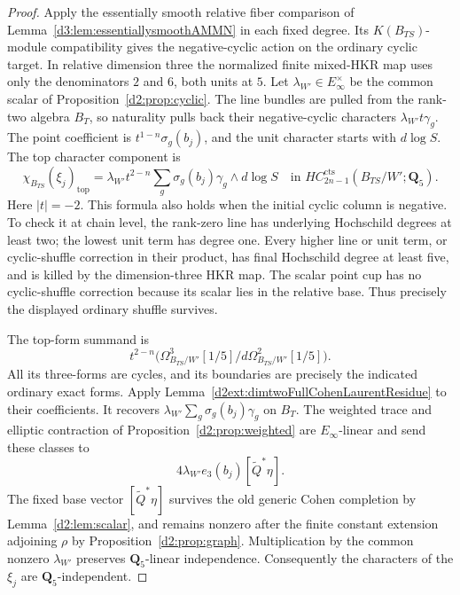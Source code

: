 \documentclass[11pt,a4paper]{amsart}
\numberwithin{equation}{section}
\theoremstyle{definition}
\theoremstyle{remark}
\begin{document}
\begin{proof}
Apply the essentially smooth relative fiber comparison of
Lemma~\ref{d3:lem:essentiallysmoothAMMN} in each fixed degree.
Its $K(B_{TS})$-module compatibility gives the negative-cyclic
action on the ordinary cyclic target.  In relative dimension
three the normalized finite mixed-HKR map uses only the
denominators $2$ and $6$, both units at $5$.
Let $\lambda_{W'}\in E_\infty^\times$ be the common scalar of
Proposition~\ref{d2:prop:cyclic}.
The line bundles are pulled from the rank-two algebra $B_T$,
so naturality pulls back their negative-cyclic characters
$\lambda_{W'}t\gamma_g$.
The point coefficient is $t^{1-n}\sigma_g(b_j)$, and the
unit character starts with $d\log S$.
The top character component is
\[
 \chi_{B_{TS}}(\xi_j)_{\mathrm{top}}
    =\lambda_{W'}t^{2-n}
       \sum_g\sigma_g(b_j)\gamma_g\wedge d\log S
       \quad\text{in }HC^{\mathrm{cts}}_{2n-1}(B_{TS}/W';
                                                    \mathbf Q_5).
\]
Here $|t|=-2$.  This formula also holds when the initial cyclic
column is negative.  To check it at chain level, the rank-zero
line has underlying Hochschild degrees at least two; the
lowest unit term has degree one.  Every higher line or unit
term, or cyclic-shuffle correction in their product, has final
Hochschild degree at least five, and is killed by the
dimension-three HKR map.  The scalar point cup has no
cyclic-shuffle correction because its scalar lies in the
relative base.  Thus precisely the displayed ordinary
shuffle survives.

The top-form summand is
\[
 t^{2-n}\bigl(
 \Omega^3_{B_{TS}/W'}[1/5]/
                  d\Omega^2_{B_{TS}/W'}[1/5]\bigr).
\]
All its three-forms are cycles, and its boundaries are precisely
the indicated ordinary exact forms.  Apply
Lemma~\ref{d2ext:dimtwoFullCohenLaurentResidue} to their coefficients.
It recovers
$\lambda_{W'}\sum_g\sigma_g(b_j)\gamma_g$ on $B_T$.
The weighted trace and elliptic contraction of
Proposition~\ref{d2:prop:weighted} are $E_\infty$-linear and send
these classes to
\[
 4\lambda_{W'}e_3(b_j)[\widetilde Q^*\eta].
\]
The fixed base vector $[\widetilde Q^*\eta]$ survives the old generic
Cohen completion by Lemma~\ref{d2:lem:scalar}, and remains
nonzero after the finite constant extension adjoining $\rho$ by
Proposition~\ref{d2:prop:graph}.
Multiplication by the common nonzero $\lambda_{W'}$ preserves
$\mathbf Q_5$-linear independence.
Consequently the characters of the $\xi_j$ are
$\mathbf Q_5$-independent.


\end{proof}
\end{document}
